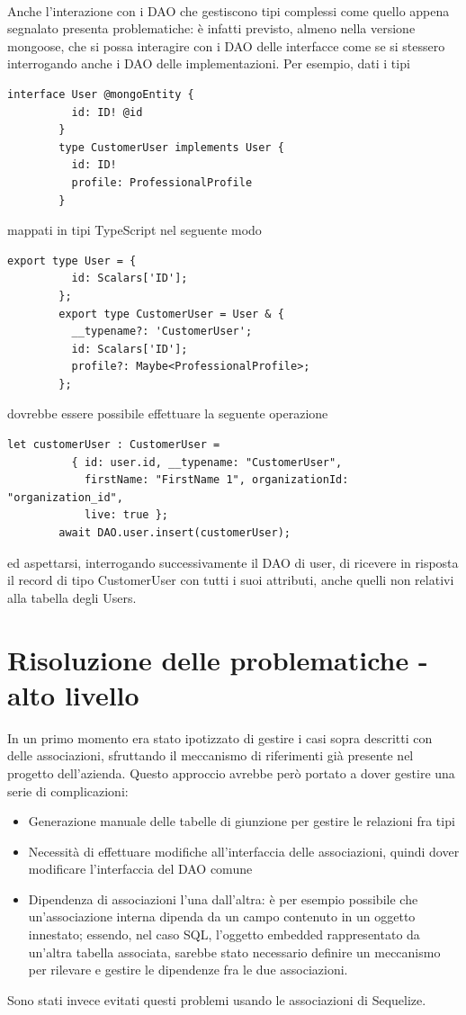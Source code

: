 \documentclass[a4paper, 12pt]{report}
\begin{document}
      \paragraph*{}
      Anche l'interazione con i DAO che gestiscono tipi complessi come quello appena segnalato presenta problematiche: è infatti previsto, almeno nella versione mongoose, che si possa interagire con i DAO delle interfacce come se si stessero interrogando anche i DAO delle implementazioni.
      Per esempio, dati i tipi
      \begin{Verbatim}[samepage=true]
        interface User @mongoEntity {
          id: ID! @id
        }
        type CustomerUser implements User {
          id: ID!
          profile: ProfessionalProfile
        }
      \end{Verbatim}
      mappati in tipi TypeScript nel seguente modo
      \begin{Verbatim}[samepage=true]
        export type User = {
          id: Scalars['ID'];
        };
        export type CustomerUser = User & {
          __typename?: 'CustomerUser';
          id: Scalars['ID'];
          profile?: Maybe<ProfessionalProfile>;
        };
      \end{Verbatim}
      dovrebbe essere possibile effettuare la seguente operazione
      \begin{Verbatim}[samepage=true]
        let customerUser : CustomerUser = 
          { id: user.id, __typename: "CustomerUser",
            firstName: "FirstName 1", organizationId: "organization_id",
            live: true };
        await DAO.user.insert(customerUser);
      \end{Verbatim}
      ed aspettarsi, interrogando successivamente il DAO di user, di ricevere in risposta il record di tipo CustomerUser con tutti i suoi attributi, anche quelli non relativi alla tabella degli Users.
    \section{Risoluzione delle problematiche - alto livello}
      In un primo momento era stato ipotizzato di gestire i casi sopra descritti con delle associazioni, sfruttando il meccanismo di riferimenti già presente nel progetto dell'azienda.
      Questo approccio avrebbe però portato a dover gestire una serie di complicazioni:
      \begin{itemize}
        \item Generazione manuale delle tabelle di giunzione per gestire le relazioni fra tipi
        \item Necessità di effettuare modifiche all'interfaccia delle associazioni, quindi dover modificare l'interfaccia del DAO comune
        \item Dipendenza di associazioni l'una dall'altra: è per esempio possibile che un'associazione interna dipenda da un campo contenuto in un oggetto innestato; essendo, nel caso SQL, l'oggetto embedded rappresentato da un'altra tabella associata, sarebbe stato necessario definire un meccanismo per rilevare e gestire le dipendenze fra le due associazioni.
      \end{itemize}
      Sono stati invece evitati questi problemi usando le associazioni di Sequelize.
\end{document}
